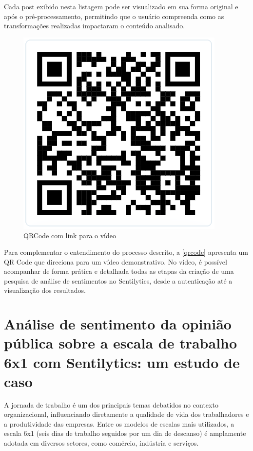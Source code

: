 \documentclass[
	12pt,				%
	oneside,			%
	a4paper,			%
	english,			%
	french,				%
	spanish,			%
	brazil				%
	]{abntex2}
\begin{document}
Cada post exibido nesta listagem pode ser visualizado em sua forma
original e após o pré-processamento, permitindo que o usuário compreenda
como as transformações realizadas impactaram o conteúdo analisado.

\begin{figure}[htbp]
\hypertarget{qrcode}{%
\caption{QRCode com link para o vídeo}\label{qrcode}
\begin{center}
\includegraphics[scale=0.6]{imagens/sentilytics/qr_code.png}
\end{center}
}
\end{figure}

Para complementar o entendimento do processo descrito, a
\autoref{qrcode} apresenta um QR Code que direciona para um vídeo
demonstrativo. No vídeo, é possível acompanhar de forma prática e
detalhada todas as etapas da criação de uma pesquisa de análise de
sentimentos no Sentilytics, desde a autenticação até a visualização dos
resultados.

\hypertarget{anuxe1lise-de-sentimento-da-opiniuxe3o-puxfablica-sobre-a-escala-de-trabalho-6x1-com-sentilytics-um-estudo-de-caso}{%
\chapter{Análise de sentimento da opinião pública sobre a escala de
trabalho 6x1 com Sentilytics: um estudo de
caso}\label{anuxe1lise-de-sentimento-da-opiniuxe3o-puxfablica-sobre-a-escala-de-trabalho-6x1-com-sentilytics-um-estudo-de-caso}}

A jornada de trabalho é um dos principais temas debatidos no contexto
organizacional, influenciando diretamente a qualidade de vida dos
trabalhadores e a produtividade das empresas. Entre os modelos de
escalas mais utilizados, a escala 6x1 (seis dias de trabalho seguidos
por um dia de descanso) é amplamente adotada em diversos setores, como
comércio, indústria e serviços.
\end{document}
